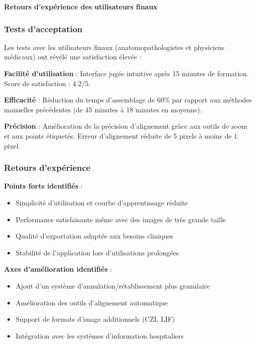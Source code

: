 \documentclass[12pt,a4paper]{report}
\begin{document}
\begin{}
\begin{}
\begin{}
\begin{}
\vspace{1em}
\begin{center}
\textbf{\large Retours d'expérience des utilisateurs finaux}
\end{center}
\vspace{0.5em}

\subsubsection{Tests d'acceptation}

Les tests avec les utilisateurs finaux (anatomopathologistes et physiciens médicaux) ont révélé une satisfaction élevée :

\textbf{Facilité d'utilisation} : Interface jugée intuitive après 15 minutes de formation. Score de satisfaction : 4.2/5.

\textbf{Efficacité} : Réduction du temps d'assemblage de 60\% par rapport aux méthodes manuelles précédentes (de 45 minutes à 18 minutes en moyenne).

\textbf{Précision} : Amélioration de la précision d'alignement grâce aux outils de zoom et aux points étiquetés. Erreur d'alignement réduite de 5 pixels à moins de 1 pixel.

\subsubsection{Retours d'expérience}

\textbf{Points forts identifiés} :
\begin{itemize}
\item Simplicité d'utilisation et courbe d'apprentissage réduite
\item Performance satisfaisante même avec des images de très grande taille
\item Qualité d'exportation adaptée aux besoins cliniques
\item Stabilité de l'application lors d'utilisations prolongées
\end{itemize}

\textbf{Axes d'amélioration identifiés} :
\begin{itemize}
\item Ajout d'un système d'annulation/rétablissement plus granulaire
\item Amélioration des outils d'alignement automatique
\item Support de formats d'image additionnels (CZI, LIF)
\item Intégration avec les systèmes d'information hospitaliers
\end{itemize}


\end{}
\end{}
\end{}
\end{}
\end{document}
